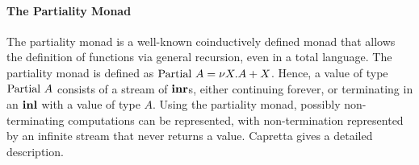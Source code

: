 %


\paragraph{The Partiality Monad} The partiality monad is a well-known
coinductively defined monad that allows the definition of functions
via general recursion, even in a total language. The partiality monad
is defined as $\textrm{Partial}~A = \nu X. A + X$. Hence, a value of
type $\textrm{Partial}~A$ consists of a stream of $\textbf{inr}$s, either
continuing forever, or terminating in an $\textbf{inl}$ with a value of
type $A$. Using the partiality monad, possibly non-terminating
computations can be represented, with non-termination represented by
an infinite stream that never returns a value. Capretta
\cite{capretta05general} gives a detailed description.

